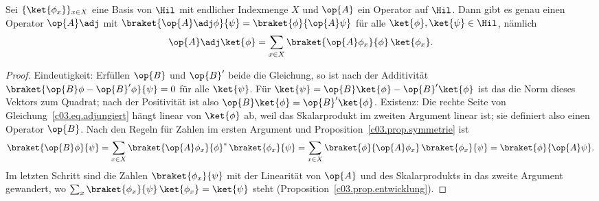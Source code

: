 \begin{proposition}\label{c03.prop.adjungiert}
  Sei $\{\ket{\phi_x}\}_{x \in X}$ eine Basis von $\Hil$ mit endlicher Indexmenge $X$ und
  $\op{A}$ ein Operator auf $\Hil$. Dann gibt es genau einen Operator $\op{A}\adj$ mit
  $\braket{\op{A}\adj\phi}{\psi} = \braket{\phi}{\op{A}\psi}$ für alle
  $\ket{\phi}, \ket{\psi} \in \Hil$, nämlich
  \begin{equation}\label{c03.eq.adjungiert}
    \op{A}\adj\ket{\phi} = \sum_{x \in X} \braket{\op{A}\phi_x}{\phi}\, \ket{\phi_x} .
  \end{equation}
\end{proposition}
\begin{proof}
  Eindeutigkeit: Erfüllen $\op{B}$ und $\op{B}'$ beide die Gleichung, so ist nach der
  Additivität $\braket{\op{B}\phi - \op{B}'\phi}{\psi} = 0$ für alle $\ket{\psi}$. Für
  $\ket{\psi} = \op{B}\ket{\phi} - \op{B}'\ket{\phi}$ ist das die Norm dieses Vektors zum
  Quadrat; nach der Positivität ist also $\op{B}\ket{\phi} = \op{B}'\ket{\phi}$. Existenz: Die
  rechte Seite von Gleichung~\eqref{c03.eq.adjungiert} hängt linear von $\ket{\phi}$ ab, weil
  das Skalarprodukt im zweiten Argument linear ist; sie definiert also einen Operator $\op{B}$.
  Nach den Regeln für Zahlen im ersten Argument und Proposition~\ref{c03.prop.symmetrie} ist
  \begin{equation}\label{c03.eq.adjungiert-beweis}
    \braket{\op{B}\phi}{\psi}
    = \sum_{x \in X} \braket{\op{A}\phi_x}{\phi}^*\, \braket{\phi_x}{\psi}
    = \sum_{x \in X} \braket{\phi}{\op{A}\phi_x}\, \braket{\phi_x}{\psi}
    = \braket{\phi}{\op{A}\psi} .
  \end{equation}
  Im letzten Schritt sind die Zahlen $\braket{\phi_x}{\psi}$ mit der Linearität von $\op{A}$ und
  des Skalarprodukts in das zweite Argument gewandert, wo
  $\sum_x \braket{\phi_x}{\psi}\, \ket{\phi_x} = \ket{\psi}$ steht
  (Proposition~\ref{c03.prop.entwicklung}).
\end{proof}

